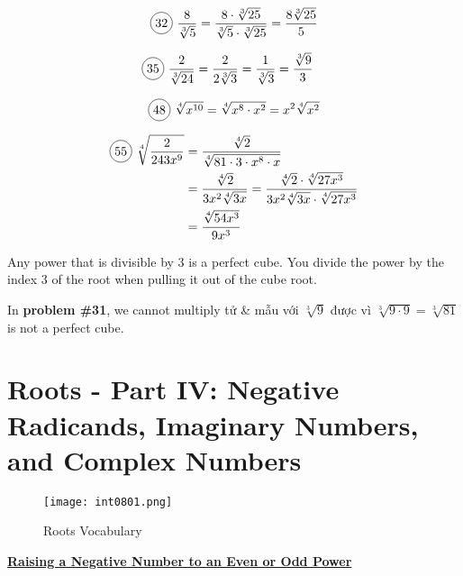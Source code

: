 \begin{multicols}{2}
  \begin{align*}
    \circled{32}\ \frac{8}{\sqrt[3]{5}}=\frac{8\cdot \sqrt[3]{25}}{\sqrt[3]{5}\cdot \sqrt[3]{25}}=\frac{8\sqrt[3]{25}}{5}
  \end{align*}

  \begin{align*}
    \circled{35}\ \frac{2}{\sqrt[3]{24}}&=\frac{2}{2\sqrt[3]{3}}=\frac{1}{\sqrt[3]{3}}=\frac{\sqrt[3]{9}}{3}
  \end{align*}

  \begin{align*}
    \circled{48}\ \sqrt[4]{x^{10}}=\sqrt[4]{x^{8}\cdot x^{2}}=x^{2}\sqrt[4]{x^{2}}
  \end{align*}

  \begin{align*}
    \circled{55}\ \sqrt[4]{\frac{2}{243x^{9}}}&=\frac{\sqrt[4]{2}}{\sqrt[4]{81\cdot 3 \cdot x^{8}\cdot x}}\\
    &=\frac{\sqrt[4]{2}}{3x^{2}\sqrt[4]{3x}}=\frac{\sqrt[4]{2}\cdot\sqrt[4]{27x^{3}}}{3x^{2}\sqrt[4]{3x}\cdot \sqrt[4]{27x^{3}}}\\
    &=\frac{\sqrt[4]{54x^{3}}}{9x^{3}}
  \end{align*}
\end{multicols}

Any power that is divisible by 3 is a perfect cube. You divide the power by the index 3 of the root when pulling it out of the cube root.

In \textbf{problem \#31}, we cannot multiply tử \& mẫu với $\sqrt[3]{9}$ được vì $\sqrt[3]{9\cdot 9}=\sqrt[3]{81}$ is not a perfect cube.

\section{Roots - Part IV: Negative Radicands, Imaginary Numbers, and Complex Numbers}


\begin{figure}[htb!]
  \centering
  \texttt{[image: int0801.png]}
  \caption{Roots Vocabulary}
\end{figure}

\vspace{0.5 cm}

\centerline{\underline{\textbf{\large Raising a Negative Number to an Even or Odd Power}}}


